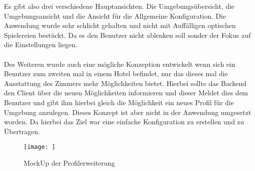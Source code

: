Es gibt also drei verschiedene Hauptansichten. Die Umgebungsübersicht, die Umgebungsansicht und die Ansicht für die Allgemeine Konfiguration. Die Anwendung wurde sehr schlicht gehalten und nicht mit Auffälligen optischen Spielereien bestückt. Da es den Benutzer nicht ablenken soll sonder der Fokus auf die Einstellungen liegen. 
\\\\
Des Weiteren wurde auch eine mögliche Konzeption entwickelt wenn sich ein Benutzer zum zweiten mal in einem Hotel befindet, nur das dieses mal die Ausstattung des Zimmers mehr Möglichkeiten bietet. Hierbei sollte das Backend den Client über die neuen Möglichkeiten informieren und dieser Meldet dies dem Benutzer und gibt ihm hierbei gleich die Möglichkeit ein neues Profil für die Umgebung anzulegen. Dieses Konzept ist aber nicht in der Anwendung umgesetzt worden. Da hierbei das Ziel war eine einfache Konfiguration zu erstellen und zu Übertragen.

\begin{figure}[H]
\texttt{[image: ]}
\caption{MockUp der Profilerweiterung}
\end{figure}



